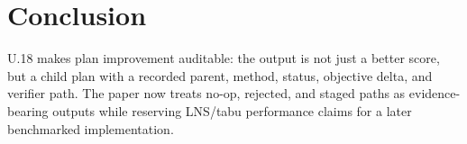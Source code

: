 \section{Conclusion}

U.18 makes plan improvement auditable: the output is not just a better score,
but a child plan with a recorded parent, method, status, objective delta, and
verifier path. The paper now treats no-op, rejected, and staged paths
as evidence-bearing outputs while reserving LNS/tabu performance claims for a
later benchmarked implementation.
